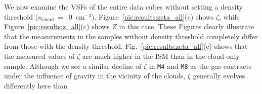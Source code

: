 
     We now examine the VSFs of the entire data cubes without setting a density 
     threshold ($n_\mathrm{cloud}~=$~0~cm$^{-3}$).  Figure~\ref{pic:results:zeta_all}(c) shows 
     $\zeta$, while Figure~\ref{pic:results:z_all}(c) shows $Z$ in this case.
%
    These Figures
clearly illustrate that the measurements in the samples without density threshold completely differ from those with the density threshold.
Fig.~\ref{pic:results:zeta_all}(c) shows that the measured values of $\zeta$ are much higher in the ISM than in the cloud-only sample.
Although we see a similar decline of $\zeta$ in \texttt{M4} and \texttt{M8} as the gas contracts under the influence of gravity in the vicinity of the clouds, $\zeta$ generally evolves differently here than %
